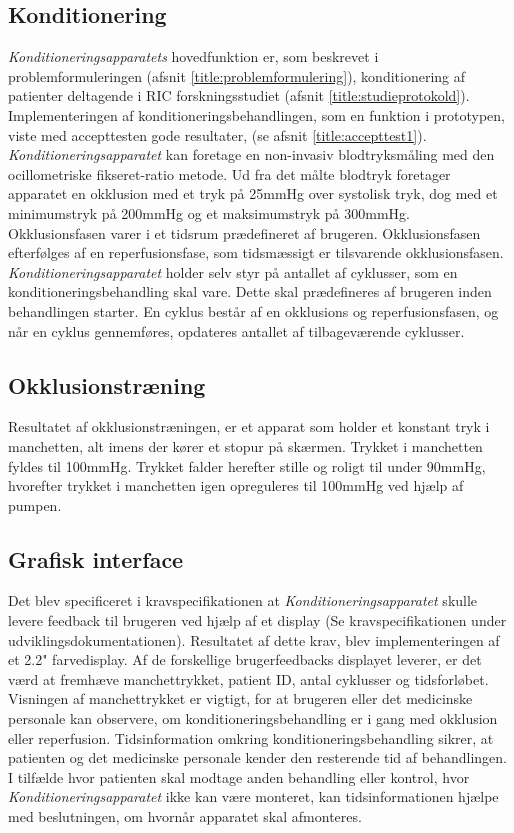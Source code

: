\subsection{Konditionering}
\textit{Konditioneringsapparatets} hovedfunktion er, som beskrevet i problemformuleringen (afsnit \ref{title:problemformulering}), konditionering af patienter deltagende i RIC forskningsstudiet (afsnit \ref{title:studieprotokold}). Implementeringen af konditioneringsbehandlingen, som en funktion i prototypen, viste med accepttesten gode resultater, (se afsnit \ref{title:accepttest1}). \textit{Konditioneringsapparatet} kan foretage en non-invasiv blodtryksmåling med den ocillometriske fikseret-ratio metode. Ud fra det målte blodtryk foretager apparatet en okklusion med et tryk på 25mmHg over systolisk tryk, dog med et minimumstryk på 200mmHg og et maksimumstryk på 300mmHg. Okklusionsfasen varer i et tidsrum prædefineret af brugeren. Okklusionsfasen efterfølges af en reperfusionsfase, som tidsmæssigt er tilsvarende okklusionsfasen. \textit{Konditioneringsapparatet} holder selv styr på antallet af cyklusser, som en konditioneringsbehandling skal vare. Dette skal prædefineres af brugeren inden behandlingen starter. En cyklus består af en okklusions og reperfusionsfasen, og når en cyklus gennemføres, opdateres antallet af tilbageværende cyklusser. 

\subsection{Okklusionstræning}
Resultatet af okklusionstræningen, er et apparat som holder et konstant tryk i manchetten, alt imens der kører et stopur på skærmen. Trykket i manchetten fyldes til 100mmHg. Trykket falder herefter stille og roligt til under 90mmHg, hvorefter trykket i manchetten igen opreguleres til 100mmHg ved hjælp af pumpen. 
 
\subsection{Grafisk interface}
Det blev specificeret i kravspecifikationen at \textit{Konditioneringsapparatet} skulle levere feedback til brugeren ved hjælp af et display (Se kravspecifikationen under udviklingsdokumentationen). Resultatet af dette krav, blev implementeringen af et 2.2" farvedisplay. Af de forskellige brugerfeedbacks displayet leverer, er det værd at fremhæve manchettrykket, patient ID, antal cyklusser og tidsforløbet. Visningen af manchettrykket er vigtigt, for at brugeren eller det medicinske personale kan observere, om konditioneringsbehandling er i gang med okklusion eller reperfusion. Tidsinformation omkring konditioneringsbehandling sikrer, at patienten og det medicinske personale kender den resterende tid af behandlingen. I tilfælde hvor patienten skal modtage anden behandling eller kontrol, hvor \textit{Konditioneringsapparatet} ikke kan være monteret, kan tidsinformationen hjælpe med beslutningen, om hvornår apparatet skal afmonteres. 


